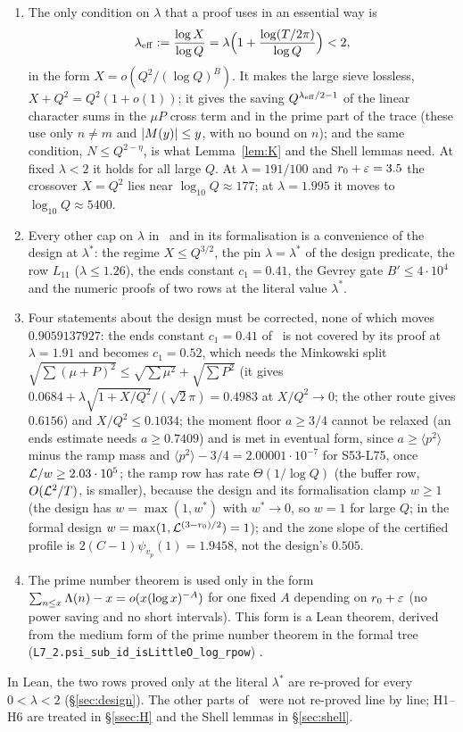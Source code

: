 \begin{enumerate}[label=(\roman*)]
\item The only condition on $\lambda$ that a proof uses in an essential way is
\[
\lambda_{\rm eff}:=\frac{\log X}{\log Q}=\lambda\Bigl(1+\frac{\log(T/2\pi)}{\log Q}\Bigr)<2,
\]
in the form $X=o(Q^2/(\log Q)^{B})$. It makes the large sieve lossless, $X+Q^2=Q^2(1+o(1))$; it gives the saving $Q^{\lambda_{\rm eff}/2-1}$
of the linear character sums in the $\mu P$ cross term and in the prime part of the trace (these use only $n\ne m$ and
$\lvert M(y)\rvert\le y$, with no bound on $n$); and the same condition, $N\le Q^{2-\eta}$, is what Lemma~\ref{lem:K} and the Shell lemmas
need. At fixed $\lambda<2$ it holds for all large $Q$. At $\lambda=191/100$ and $r_0+\varepsilon=3.5$ the crossover $X=Q^2$ lies near
$\log_{10}Q\approx177$; at $\lambda=1.995$ it moves to $\log_{10}Q\approx5400$.
\item Every other cap on $\lambda$ in~\cite{DSouza} and in its formalisation is a convenience of the design at $\lambda^*$: the
regime $X\le Q^{3/2}$, the pin $\lambda=\lambda^*$ of the design predicate, the row $L_{11}$ ($\lambda\le1.26$), the ends constant
$c_1=0.41$, the Gevrey gate $B'\le4\cdot10^4$ and the numeric proofs of two rows at the literal value $\lambda^*$.
\item Four statements about the design must be corrected, none of which moves $0.9059137927$:
the ends constant $c_1=0.41$ of~\cite[Lemma~8.1]{DSouza} is not covered by its proof at $\lambda=1.91$ and becomes $c_1=0.52$,
which needs the Minkowski split $\sqrt{\sum(\mu+P)^2}\le\sqrt{\sum\mu^2}+\sqrt{\sum P^2}$ (it gives $0.0684+\lambda\sqrt{1+X/Q^2}/(\sqrt2\pi)=0.4983$
at $X/Q^2\to0$; the other route gives $0.6156$) and $X/Q^2\le0.1034$;
the moment floor $a\ge3/4$ cannot be relaxed (an ends estimate needs $a\ge0.7409$) and is met in eventual form, since $a\ge\langle p^2\rangle$
minus the ramp mass and $\langle p^2\rangle-3/4=2.00001\cdot10^{-7}$ for S53-L75, once $\mathcal L/w\ge2.03\cdot10^5$;
the ramp row has rate $\Theta(1/\log Q)$ (the buffer row, $O(\mathcal L^2/T)$, is smaller), because the design and its formalisation clamp $w\ge1$ (the design has $w=\max(1,w^*)$ with $w^*\to0$, so $w=1$ for
large $Q$; in the formal design $w=\max(1,\mathcal L^{(3-r_0)/2})=1$);
and the zone slope of the certified profile is $2(C-1)\psi_{v_p}(1)=1.9458$, not the design's $0.505$.
\item The prime number theorem is used only in the form $\sum_{n\le x}\Lambda(n)-x=o(x(\log x)^{-A})$ for one fixed $A$ depending on $r_0+\varepsilon$
(no power saving and no short intervals). This form is a Lean theorem, derived from the medium form of the prime number
theorem in the formal tree (\texttt{L7\_2.psi\_sub\_id\_isLittleO\_log\_rpow}) \tagL.
\end{enumerate}
In Lean, the two rows proved only at the literal $\lambda^*$ are re-proved for every $0<\lambda<2$ (\S\ref{sec:design}).
The other parts of~\cite[\S\S4--10]{DSouza} were not re-proved line by line; H1--H6 are treated in \S\ref{ssec:H} and the Shell lemmas in
\S\ref{sec:shell}.
